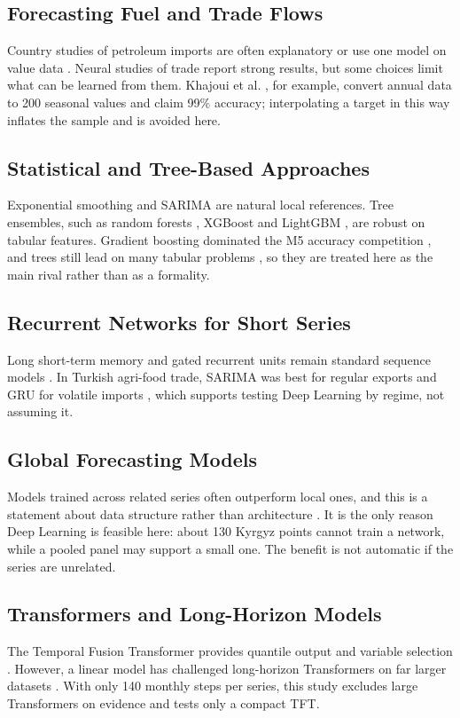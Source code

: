 \documentclass[conference]{IEEEtran}
\begin{document}
\subsection{Forecasting Fuel and Trade Flows}
Country studies of petroleum imports are often explanatory or use one model on value data \cite{pradhan2023,santi2023}. Neural studies of trade report strong results, but some choices limit what can be learned from them. Khajoui et al. \cite{khajoui2024}, for example, convert annual data to 200 seasonal values and claim 99\% accuracy; interpolating a target in this way inflates the sample and is avoided here.

\subsection{Statistical and Tree-Based Approaches}
Exponential smoothing and SARIMA are natural local references. Tree ensembles, such as random forests \cite{breiman2001}, XGBoost \cite{chen2016} and LightGBM \cite{ke2017}, are robust on tabular features. Gradient boosting dominated the M5 accuracy competition \cite{makridakis2022}, and trees still lead on many tabular problems \cite{grinsztajn2022}, so they are treated here as the main rival rather than as a formality.

\subsection{Recurrent Networks for Short Series}
Long short-term memory \cite{hochreiter1997} and gated recurrent units \cite{cho2014} remain standard sequence models \cite{hewamalage2021}. In Turkish agri-food trade, SARIMA was best for regular exports and GRU for volatile imports \cite{abedi2025}, which supports testing Deep Learning by regime, not assuming it.

\subsection{Global Forecasting Models}
Models trained across related series often outperform local ones, and this is a statement about data structure rather than architecture \cite{montero2021,semenoglou2021,hewamalage2022}. It is the only reason Deep Learning is feasible here: about 130 Kyrgyz points cannot train a network, while a pooled panel may support a small one. The benefit is not automatic if the series are unrelated.

\subsection{Transformers and Long-Horizon Models}
The Temporal Fusion Transformer provides quantile output and variable selection \cite{lim2021}. However, a linear model has challenged long-horizon Transformers on far larger datasets \cite{zeng2023}. With only 140 monthly steps per series, this study excludes large Transformers on evidence and tests only a compact TFT.
\end{document}
